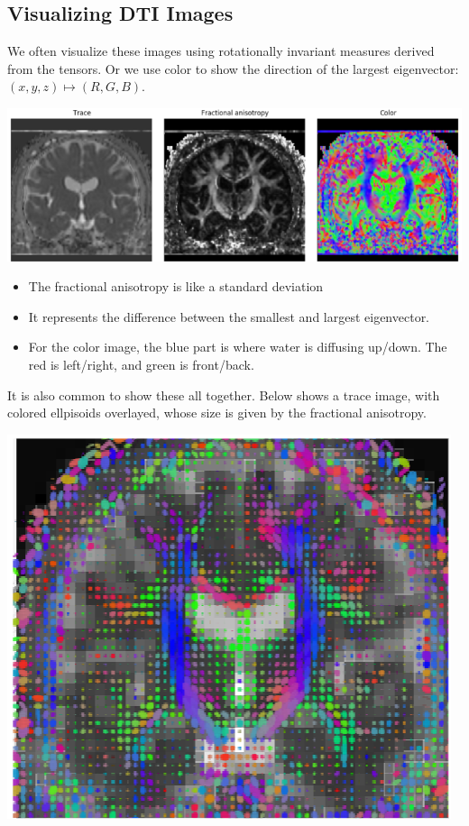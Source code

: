 \documentclass[10pt]{article}
\begin{document}
\subsection*{Visualizing DTI Images}
We often visualize these images using rotationally invariant measures derived from the tensors.  Or we use color to show the direction of the largest eigenvector: $(x, y, z) \mapsto (R, G, B)$.
\begin{center} 
	\includegraphics*[width=\textwidth]{W10_3.png} 
\end{center}
\begin{itemize}
	\item The fractional anisotropy is like a standard deviation
	\item It represents the difference between the smallest and largest eigenvector.
	\item For the color image, the blue part is where water is diffusing up/down.  The red is left/right, and green is front/back.
\end{itemize}
It is also common to show these all together.  Below shows a trace image, with colored ellpisoids overlayed, whose size is given by the fractional anisotropy.
\begin{center} 
	\includegraphics*[width=\textwidth]{W10_4.png} 
\end{center}
\end{document}
